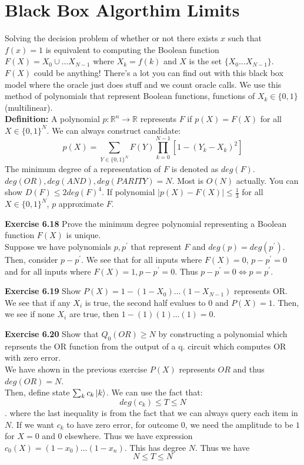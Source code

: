 \documentclass{article}
\begin{document}
\section{Black Box Algorthim Limits}
Solving the decision problem of whether or not there exists $x$ such that $f(x) = 1$ is equivalent to computing the Boolean function $F(X) = X_0 \cup \dots X_{N-1}$ where $X_k = f(k)$ and $X$ is the set $\{ X_0 \dots X_{N-1}\}$. $F(X)$ could be anything! There's a lot you can find out with this black box model where the oracle just does stuff and we count oracle calls. We use this method of polynomials that represent Boolean functions, functions of $X_k \in \{0,1\}$ (multilinear).\\\textbf{Definition:} A polynomial $p: \mathbb{R}^n \to \mathbb{R}$ represents $F$ if $p(X) = F(X)$ for all $X \in \{0,1\}^N$. We can always construct candidate:
$$p(X) = \sum_{Y \in \{0,1\}^N} F(Y) \prod_{k=0}^{N-1} [1-(Y_k-X_k)^2]$$
The minimum degree of a representation of $F$ is denoted as $deg(F)$. $deg(OR), deg(AND), deg(PARITY) = N$. Most is $O(N)$ actually. You can show $D(F) \leq 2 deg (F)^4$. If polynomial $|p(X) - F(X)| \leq \frac{1}{3}$ for all $X \in \{0,1\}^N$, $p$ approximate $F$.
\begin{tcolorbox}\textbf{Exercise 6.18} Prove the minimum degree polynomial representing a Boolean function $F(X)$ is unique.\\
Suppose we have polynomials $p, p^{'}$ that represent $F$ and $deg(p) = deg(p^{'})$.\\
Then, consider $p - p^{'}$. We see that for all inputs where $F(X) = 0$, $p-p^{'} = 0$ and for all inputs where $F(X) = 1, p-p^{'} = 0$. Thus $p - p^{'} = 0 \iff p = p^{'}$.
\end{tcolorbox}
\begin{tcolorbox}\textbf{Exercise 6.19} Show $P(X) = 1 -(1-X_0)\dots(1-X_{N-1})$ represents OR.\\
	We see that if any $X_i$ is true, the second half evalues to 0 and $P(X) = 1$. Then, we see if none $X_i$ are true, then $1-(1)(1)\dots(1) = 0$.\\
	\end{tcolorbox}
	\begin{tcolorbox}\textbf{Exercise 6.20} Show that $Q_0(OR) \geq N$ by constructing a polynomial which reprsents the OR function from the output of a q. circuit which computes OR with zero error.\\
		We have shown in the previous exercise $P(X)$ represents $OR$ and thus $deg(OR) = N$.\\
		Then, define state $\sum_k c_k \ket{k}$. We can use the fact that:
		$$deg(c_k) \leq T \leq N$$.
		where the last inequality is from the fact that we can always query each item in $N$.
		If we want $c_k$ to have zero error, for outcome 0, we need the amplitude to be $1$ for $X=0$ and 0 elsewhere. Thus we have expression $c_0(X) = (1 - x_0)\dots(1-x_n)$. This has degree $N$.
		Thus we have $$N \leq T \leq N$$
	\end{tcolorbox}
\end{document}
